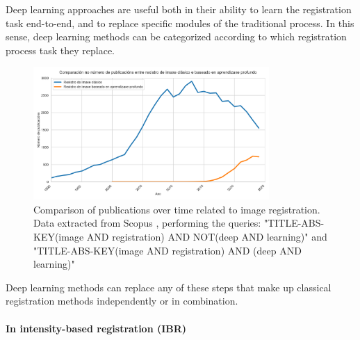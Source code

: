 Deep learning approaches are useful both in their ability to learn the registration task end-to-end, and to replace specific modules of the traditional process.
In this sense, deep learning methods can be categorized according to which registration process task they replace.

\begin{figure}[tbp]
\centering
\includegraphics[width=0.8\textwidth]{imaxes/methods_comp.png}
\caption{Comparison of publications over time related to image registration. Data extracted from Scopus \cite{scopus}, performing the queries: "TITLE-ABS-KEY(image AND registration) AND NOT(deep AND learning)" and "TITLE-ABS-KEY(image AND registration) AND (deep AND learning)"}
\label{fig:method_comp}
\end{figure}

Deep learning methods can replace any of these steps that make up classical registration methods independently or in combination.

\paragraph{In intensity-based registration (IBR)}
\label{par:IBR_substitution}

